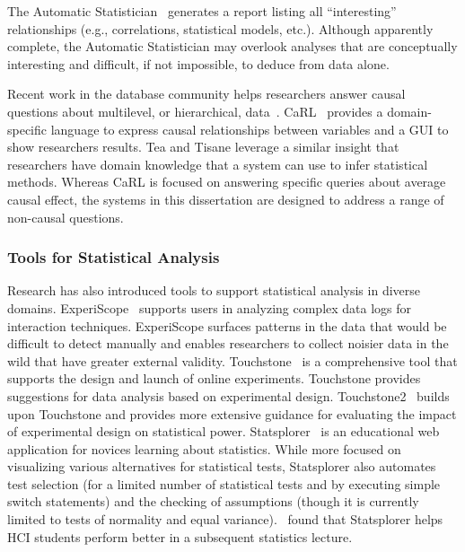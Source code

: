 The Automatic Statistician~\cite{lloyd2014automatic} generates a report listing
all ``interesting'' relationships (e.g., correlations, statistical models,
etc.). %
Although apparently complete, the Automatic Statistician may overlook analyses
that are conceptually interesting and difficult, if not impossible, to deduce
from data alone.

Recent work in the database community helps researchers answer causal questions
about multilevel, or hierarchical, data~\cite{salimi2020causal, kayali2020demonstration}.
CaRL~\cite{salimi2020causal} provides a domain-specific language to express
causal relationships between variables and a GUI to show researchers %
results. Tea and Tisane leverage a similar insight that researchers have domain
knowledge that a system can use to infer statistical methods. Whereas CaRL is
focused on answering specific queries about average causal effect, the systems
in this dissertation are designed to address a range of non-causal questions.

\subsubsection{Tools for Statistical Analysis}
Research has also introduced tools to support statistical analysis in diverse
domains. ExperiScope~\cite{guimbretiere2007experiscope} supports users in
analyzing complex data logs for interaction techniques. ExperiScope surfaces
patterns in the data that would be difficult to detect manually and enables
researchers to collect noisier data in the wild that have greater external
validity. Touchstone~\cite{mackay2007touchstone} is a comprehensive tool that
supports the design and launch of online experiments. Touchstone provides
suggestions for data analysis based on experimental design.
Touchstone2~\cite{eiselmayer2019touchstone2} builds upon Touchstone and provides
more extensive guidance for evaluating the impact of experimental design on
statistical power. Statsplorer~\cite{wacharamanotham2015statsplorer} is an
educational web application for novices learning about statistics. While more
focused on visualizing various alternatives for statistical tests, Statsplorer
also automates test selection (for a limited number of statistical tests and by
executing simple switch statements) and the checking of assumptions (though it
is currently limited to tests of normality and equal
variance).~\cite{wacharamanotham2015statsplorer} found that Statsplorer helps
HCI students perform better in a subsequent statistics lecture. 

